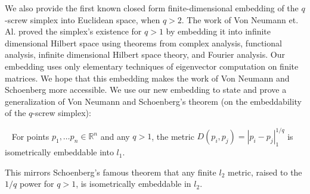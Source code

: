 We also provide the first known closed form finite-dimensional embedding of
the $q$-screw simplex into Euclidean space, when $q>2$. The work of Von
Neumann et. Al. proved the simplex's existence for $q>1$ by embedding it
into infinite dimensional Hilbert space using theorems from complex
analysis, functional analysis, infinite dimensional Hilbert space theory,
and Fourier analysis. Our embedding uses only elementary techniques of
eigenvector computation on finite matrices. We hope that this embedding
makes the work of Von Neumann and Schoenberg more accessible. We use our
new embedding to state and prove a generalization of Von Neumann and
Schoenberg’s theorem (on the embeddability of the $q$-screw simplex):

\begin{theorem}~\label{thm:l1} For points $p_1, \ldots p_n \in
\mathbb{R}^n$ and any $q > 1$, the metric $D(p_i, p_j) = |p_i-p_j|_1^{1/q}$
is isometrically embeddable into $l_1$.\end{theorem} This mirrors
Schoenberg's famous theorem that any finite $l_2$ metric, raised to the
$1/q$ power for $q > 1$, is isometrically embeddable in $l_2$.

